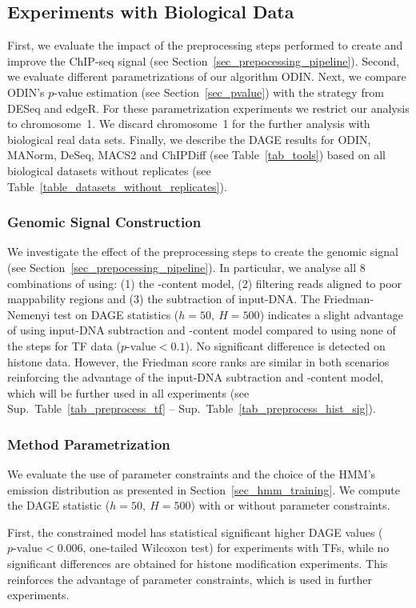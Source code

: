 \subsection{Experiments with Biological Data}
First, we evaluate the impact of the preprocessing steps performed to create and improve the ChIP-seq signal (see Section~\ref{sec_prepocessing_pipeline}).
Second, we evaluate different parametrizations of our algorithm ODIN.
Next, we compare ODIN's $p$-value estimation (see Section~\ref{sec_pvalue}) with the strategy from DESeq and edgeR.
For these parametrization experiments we restrict our analysis to chromosome~1.
We discard chromosome~1 for the further analysis with biological real data sets.
Finally, we describe the DAGE results for ODIN, MANorm, DeSeq, MACS2 and ChIPDiff (see Table~\ref{tab_tools}) based on all biological datasets without replicates (see Table~\ref{table_datasets_without_replicates}).

\subsubsection{Genomic Signal Construction}
We investigate the effect of the preprocessing steps to create the genomic signal (see Section~\ref{sec_prepocessing_pipeline}).
In particular, we analyse all 8 combinations of using: (1) the -content model, (2) filtering reads aligned to poor mappability regions and (3) the subtraction of input-DNA. 
The Friedman-Nemenyi test on DAGE statistics ($h=50,\ H=500$) indicates a slight advantage of using input-DNA subtraction and -content model compared to using none of the steps for TF data ($p\text{-value} < 0.1$). 
No significant difference is detected on histone data. 
However, the Friedman score ranks are similar in both scenarios reinforcing the advantage of the input-DNA subtraction and -content model, which will be further used in all experiments (see Sup.~Table~\ref{tab_preprocess_tf} -- Sup.~Table~\ref{tab_preprocess_hist_sig}).



\subsubsection{Method Parametrization}
We evaluate the use of parameter constraints and the choice of the HMM's emission distribution as presented in Section~\ref{sec_hmm_training}. 
We compute the DAGE statistic ($h=50,\ H=500$) with or without parameter constraints.

First, the constrained model has statistical significant higher DAGE values ($p\text{-value} < 0.006$, one-tailed Wilcoxon test) for experiments with TFs, while no significant differences are obtained for histone modification experiments. 
This reinforces the advantage of parameter constraints, which is used in further experiments.

